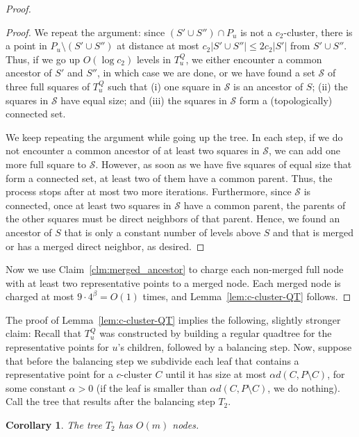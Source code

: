 \documentclass[11pt]{paper}
\newtheorem {cor}[theorem] {Corollary}
\begin{document}
\begin{proof}
\begin{proof}
      We repeat the argument: since
      $(S' \cup S'') \cap P_u$ is not a $c_2$-cluster, there is a point in
      $P_u \setminus (S' \cup S'')$ at distance
      at most $c_2|S' \cup S''| \leq 2c_2|S'|$ from $S' \cup S''$. Thus, if we go up
      $O(\log c_2)$ levels in $T_u^Q$, we either encounter a common ancestor
      of $S'$ and $S''$, in which case we are done, or we have found
      a set $\mathcal{S}$ of
      three full squares of $T_u^Q$ such that (i) one square in
      $\mathcal{S}$ is an ancestor of $S$; (ii) the squares in $\mathcal{S}$
      have equal size;  and (iii) the squares in $\mathcal{S}$ 
      form a (topologically) connected set.

      We keep repeating the argument while going up the tree. 
      In each step, if we do not encounter a common ancestor of
      at least two squares in $\mathcal{S}$,
      we can add one more full square to $\mathcal{S}$.
      However, as soon as we have five squares of equal size
      that form a connected set, at least two of them have a common
      parent. Thus, the process stops after at most two more
      iterations. Furthermore, since $\mathcal{S}$ is connected, once at least two 
      squares in $\mathcal{S}$ have a common parent, the parents of the other
      squares must be direct neighbors of that parent. Hence, 
      we found an ancestor of $S$ that is
      only a constant number of levels above $S$ and that is merged
      or has a merged direct neighbor, as desired.
      \end{proof}
      
      Now we use Claim~\ref{clm:merged_ancestor} to charge
      each non-merged full node with at least two representative points
      to a merged node.
      Each merged node is charged at most 
      $9 \cdot 4^\beta = O(1)$ times, and Lemma~\ref{lem:c-cluster-QT} 
      follows.
      \end{proof}

  The proof of Lemma~\ref{lem:c-cluster-QT} implies the following, slightly
  stronger claim: Recall that $T^Q_u$ was constructed by building
  a regular quadtree for the representative points for $u$'s children,
  followed by a balancing step. Now, suppose that before the balancing
  step we subdivide each leaf that contains a representative
  point for a $c$-cluster $C$ until it has size at 
  most $\alpha d(C, P \setminus C)$, for some constant $\alpha > 0$ (if the 
  leaf is smaller than $\alpha d(C, P \setminus C)$, we do nothing).
  Call the tree that results after the balancing step $T_2$.
  \begin{cor}\label{cor:c-cluster-QT-extended}
      The tree $T_2$ has $O(m)$ nodes.
  \end{cor}
\end{document}
